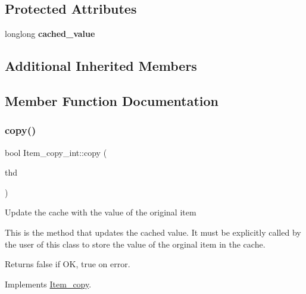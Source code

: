 \subsection*{Protected Attributes}
\begin{DoxyCompactItemize}
\item 
\mbox{\label{classItem__copy__int_a6d22d22c2d58b99ce67e5ec206eca95b}} 
longlong {\bfseries cached\+\_\+value}
\end{DoxyCompactItemize}
\subsection*{Additional Inherited Members}


\subsection{Member Function Documentation}
\mbox{\label{classItem__copy__int_adb454f84e2c727dfc8891347f51c4fae}} 
\subsubsection{\texorpdfstring{copy()}{copy()}}
{\footnotesize\ttfamily bool Item\+\_\+copy\+\_\+int\+::copy (\begin{DoxyParamCaption}\item[{const T\+HD $\ast$}]{thd }\end{DoxyParamCaption})\hspace{0.3cm}{\ttfamily [virtual]}}

Update the cache with the value of the original item

This is the method that updates the cached value. It must be explicitly called by the user of this class to store the value of the orginal item in the cache. \begin{DoxyReturn}{Returns}
false if OK, true on error. 
\end{DoxyReturn}


Implements \mbox{\hyperlink{classItem__copy_a575caec22eeb27fb76d5aa74b1a8d492}{Item\+\_\+copy}}.

\mbox{\label{classItem__copy__int_add731c9db4197e971b70f6f4b1b988cc}} 
